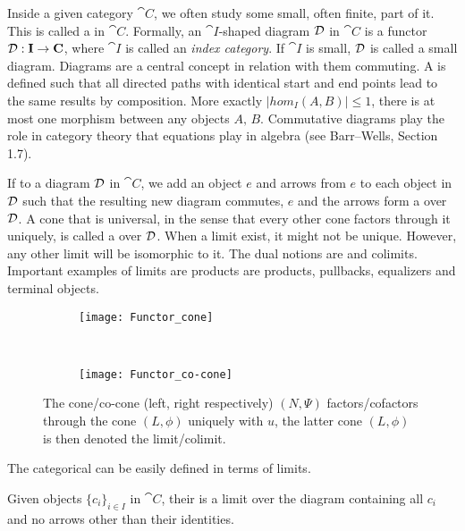 \documentclass[../../main.tex]{subfiles}
\begin{document}
    Inside a given category $\cat{C}$, we often study some small, often finite, part of it. This is called a  in $\cat{C}$. Formally, an $\cat{I}$-shaped diagram $\mathcal{D}$ in $\cat{C}$ is a functor $\mathcal{D}: \mathbf{I} \to \mathbf{C}$, where $\cat{I}$ is called an \emph{index category}. If $\cat{I}$ is small, $\mathcal{D}$ is called a small diagram. Diagrams are a central concept in relation with them commuting. A  is defined such that all directed paths with identical start and end points lead to the same results by composition. More exactly $|hom_I(A,B)|\leq 1$, there is at most one morphism between any objects $A,\,B$. Commutative diagrams play the role in category theory that equations play in algebra (see Barr–Wells, Section 1.7).%
    
    If to a diagram $\mathcal{D}$ in $\cat{C}$, we add an object $e$ and arrows from $e$ to each object in $\mathcal{D}$ such that the resulting new diagram commutes, $e$ and the arrows form a  over $\mathcal{D}$. A cone that is universal, in the sense that every other cone factors through it uniquely, is called a  over $\mathcal{D}$. When a limit exist, it might not be unique. However, any other limit will be isomorphic to it. The dual notions are  and colimits. Important examples of limits are products are products, pullbacks, equalizers and terminal objects.
    
    \begin{figure}[H]
        \centering
        \begin{subfigure}[b]{0.5\textwidth}
            \centering
            \texttt{[image: Functor\_cone]}
            \caption{}
        \end{subfigure}%
        ~ 
        \begin{subfigure}[b]{0.5\textwidth}
            \centering
            \texttt{[image: Functor\_co-cone]}
            \caption{}
        \end{subfigure}
        \caption{The cone/co-cone (left, right respectively) $(N,\Psi)$ factors/cofactors through the cone $(L,\phi)$ uniquely with $u$, the latter cone $(L,\phi)$ is then denoted the limit/colimit.}
    \end{figure}
    
    The categorical  can be easily defined in terms of limits. 
    
    \begin{definition}
        Given objects $\{c_i\}_{i \in I}$ in $\cat{C}$, their  is a limit over the diagram containing all $c_i$ and no arrows other than their identities.
    \end{definition}
    
\end{document}
